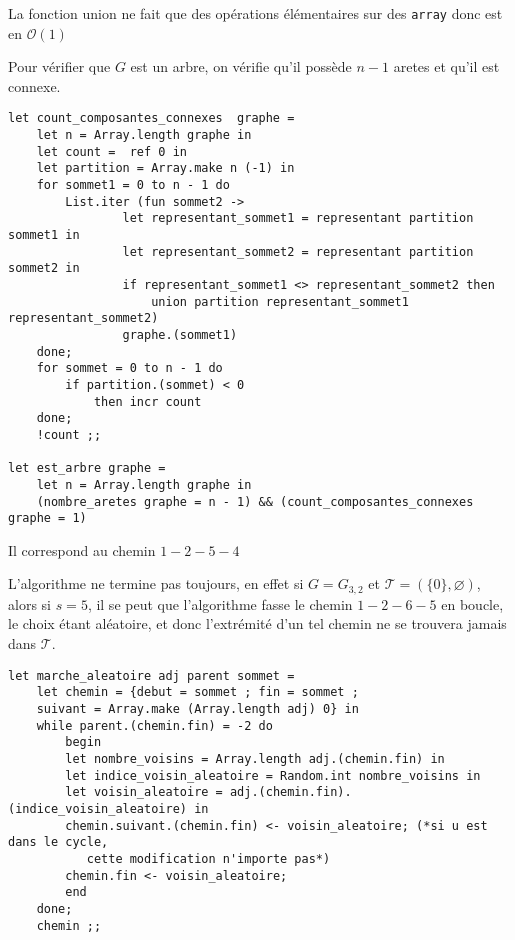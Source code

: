 \documentclass{article}
\begin{document}
\begin{question}
    La fonction union ne fait que des opérations élémentaires sur des 
    \verb|array| donc est en $\mathcal{O}(1)$

    \item Pour vérifier que $G$ est un arbre, on vérifie qu'il possède $n - 1$ 
    aretes et qu'il est connexe.
    
    \begin{verbatim}
let count_composantes_connexes  graphe =
    let n = Array.length graphe in
    let count =  ref 0 in
    let partition = Array.make n (-1) in
    for sommet1 = 0 to n - 1 do
        List.iter (fun sommet2 ->
                let representant_sommet1 = representant partition sommet1 in
                let representant_sommet2 = representant partition sommet2 in
                if representant_sommet1 <> representant_sommet2 then
                    union partition representant_sommet1 representant_sommet2)
                graphe.(sommet1)
    done;
    for sommet = 0 to n - 1 do
        if partition.(sommet) < 0
            then incr count
    done;
    !count ;;

let est_arbre graphe =
    let n = Array.length graphe in
    (nombre_aretes graphe = n - 1) && (count_composantes_connexes graphe = 1)
    \end{verbatim}

    \item Il correspond au chemin $1-2-5-4$

    \item L'algorithme ne termine pas toujours, en effet si $G = G_{3,2}$ et
    $\mathcal{T} = (\{0\}, \varnothing)$, alors si $s = 5$, il se peut que
    l'algorithme fasse le chemin $1-2-6-5$ en boucle, le choix étant aléatoire,
    et donc l'extrémité d'un tel chemin ne se trouvera jamais dans 
    $\mathcal{T}$.

    \item \begin{verbatim}
let marche_aleatoire adj parent sommet =
    let chemin = {debut = sommet ; fin = sommet ; 
    suivant = Array.make (Array.length adj) 0} in
    while parent.(chemin.fin) = -2 do
        begin
        let nombre_voisins = Array.length adj.(chemin.fin) in
        let indice_voisin_aleatoire = Random.int nombre_voisins in
        let voisin_aleatoire = adj.(chemin.fin).(indice_voisin_aleatoire) in
        chemin.suivant.(chemin.fin) <- voisin_aleatoire; (*si u est dans le cycle, 
           cette modification n'importe pas*)
        chemin.fin <- voisin_aleatoire;
        end
    done;
    chemin ;;
    \end{verbatim}


\end{question}
\end{document}
